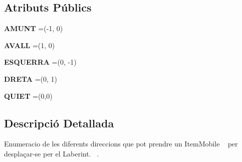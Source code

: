 \subsection*{Atributs Públics}
\begin{DoxyCompactItemize}
\item 
\hypertarget{enumlogica_1_1enumeracions_1_1_e_direccio_a63eeb22e6f9d80a71a098b28e8852e1f}{{\bfseries A\+M\+U\+N\+T} =(-\/1, 0)}\label{enumlogica_1_1enumeracions_1_1_e_direccio_a63eeb22e6f9d80a71a098b28e8852e1f}

\item 
\hypertarget{enumlogica_1_1enumeracions_1_1_e_direccio_aa3a1d108fcda907ca1d07280769f1ec9}{{\bfseries A\+V\+A\+L\+L} =(1, 0)}\label{enumlogica_1_1enumeracions_1_1_e_direccio_aa3a1d108fcda907ca1d07280769f1ec9}

\item 
\hypertarget{enumlogica_1_1enumeracions_1_1_e_direccio_af02594ddfc4fb25ba88bd8b448701f30}{{\bfseries E\+S\+Q\+U\+E\+R\+R\+A} =(0, -\/1)}\label{enumlogica_1_1enumeracions_1_1_e_direccio_af02594ddfc4fb25ba88bd8b448701f30}

\item 
\hypertarget{enumlogica_1_1enumeracions_1_1_e_direccio_afcd65da7e385fd56a4d6bd779e18f241}{{\bfseries D\+R\+E\+T\+A} =(0, 1)}\label{enumlogica_1_1enumeracions_1_1_e_direccio_afcd65da7e385fd56a4d6bd779e18f241}

\item 
\hypertarget{enumlogica_1_1enumeracions_1_1_e_direccio_a252e9ca4de38eba90bca90b4ddc5cb3d}{{\bfseries Q\+U\+I\+E\+T} =(0,0)}\label{enumlogica_1_1enumeracions_1_1_e_direccio_a252e9ca4de38eba90bca90b4ddc5cb3d}

\end{DoxyCompactItemize}


\subsection{Descripció Detallada}
Enumeracio de les diferents direccions que pot prendre un Item\+Mobile ~\newline
per desplaçar-\/se per el Laberint.~\newline
. 

